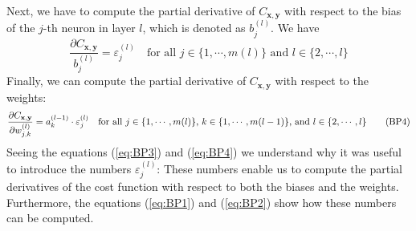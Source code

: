 Next, we have to compute the partial derivative of $C_{\mathbf{x}, \mathbf{y}}$ with respect to the bias of the
$j$-th neuron in layer $l$, which is denoted as $b_j^{(l)}$.  We have
\begin{equation}
  \label{eq:BP3}
  \frac{\partial C_{\mathbf{x}, \mathbf{y}}}{b_j^{(l)}} = \varepsilon_j^{(l)}
  \quad \mbox{for all $j \in \{1,\cdots,m(l)\}$ and $l \in \{2, \cdots,l\}$}
  \tag{BP3}
\end{equation}
Finally, we can compute the  partial derivative of $C_{\mathbf{x}, \mathbf{y}}$ with respect to the weights:
\begin{equation}
  \label{eq:BP4}
  \frac{\partial C_{\mathbf{x}, \mathbf{y}}}{\partial w_{j,k}^{(l)}} = a_k^{(l-1)} \cdot \varepsilon_j^{(l)}
  \quad \mbox{for all $j \in \{1,\cdots,m(l)\}$, $ k \in \{1,\cdots,m(l-1)\}$, and $l \in \{2, \cdots,l\}$}
  \tag{BP4}
\end{equation}
Seeing the equations (\ref{eq:BP3}) and (\ref{eq:BP4})  we understand why it was useful to introduce the
numbers $\varepsilon_j^{(l)}$: These numbers enable us to compute the partial derivatives of the cost function
with respect to both the biases and the weights.  Furthermore, the equations (\ref{eq:BP1}) and (\ref{eq:BP2})
show how these numbers can be computed.

